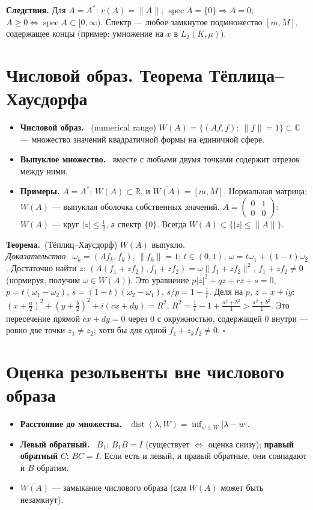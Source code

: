 \documentclass[11pt,a4paper]{article}
\newcommand{\CC}{\mathbb C}
\newcommand{\RR}{\mathbb R}
\newcommand{\spec}{\operatorname{spec}}
\newcommand{\dist}{\operatorname{dist}}
\newcommand{\df}[1]{\textbf{#1.}~}
\newcommand{\thm}{\textbf{Теорема.}~}
\newcommand{\pf}{\textit{Доказательство.}~}
\newcommand{\qedd}{\hfill$\square$}
\begin{document}
\textbf{Следствия.} Для $A=A^*$: $r(A)=\|A\|$; $\spec A=\{0\}\Rightarrow A=0$; $A\ge0\iff\spec A\subset[0,\infty)$. Спектр — любое замкнутое подмножество $[m,M]$, содержащее концы (пример: умножение на $x$ в $L_2(K,\mu)$).

\section{Числовой образ. Теорема Тёплица–Хаусдорфа}
\begin{defs}
\begin{itemize}
\item \df{Числовой образ} (numerical range) $W(A)=\{(Af,f):\ \|f\|=1\}\subset\CC$ — множество значений квадратичной формы на единичной сфере.
\item \df{Выпуклое множество} вместе с любыми двумя точками содержит отрезок между ними.
\item \textbf{Примеры.} $A=A^*$: $W(A)\subset\RR$, и $\overline{W(A)}=[m,M]$. Нормальная матрица: $W(A)$ — выпуклая оболочка собственных значений. $A=\begin{pmatrix}0&1\\0&0\end{pmatrix}$: $W(A)$ — круг $|z|\le\frac12$, а спектр $\{0\}$. Всегда $W(A)\subset\{|z|\le\|A\|\}$.
\end{itemize}
\end{defs}

\thm (Тёплиц–Хаусдорф) $W(A)$ выпукло.\\
\pf $\omega_k=(Af_k,f_k)$, $\|f_k\|=1$; $t\in(0,1)$, $\omega=t\omega_1+(1-t)\omega_2$. Достаточно найти $z$: $(A(f_1+zf_2),f_1+zf_2)=\omega\|f_1+zf_2\|^2$, $f_1+zf_2\ne0$ (нормируя, получим $\omega\in W(A)$). Это уравнение $p|z|^2+qz+r\bar z+s=0$, $p=t(\omega_1-\omega_2)$, $s=(1-t)(\omega_2-\omega_1)$, $s/p=1-\frac1t$. Деля на $p$, $z=x+iy$: $(x+\frac a2)^2+(y+\frac b2)^2+i(cx+dy)=R^2$, $R^2=\frac1t-1+\frac{a^2+b^2}4>\frac{a^2+b^2}4$. Это пересечение прямой $cx+dy=0$ через $0$ с окружностью, содержащей $0$ внутри — ровно две точки $z_1\ne z_2$; хотя бы для одной $f_1+z_kf_2\ne0$. \qedd

\section{Оценка резольвенты вне числового образа}
\begin{defs}
\begin{itemize}
\item \df{Расстояние до множества} $\dist(\lambda,W)=\inf_{w\in W}|\lambda-w|$.
\item \df{Левый обратный} $B_1$: $B_1B=I$ (существует $\iff$ оценка снизу); \textbf{правый обратный} $C$: $BC=I$. Если есть и левый, и правый обратные, они совпадают и $B$ обратим.
\item $\overline{W(A)}$ — замыкание числового образа (сам $W(A)$ может быть незамкнут).
\end{itemize}
\end{defs}
\end{document}
